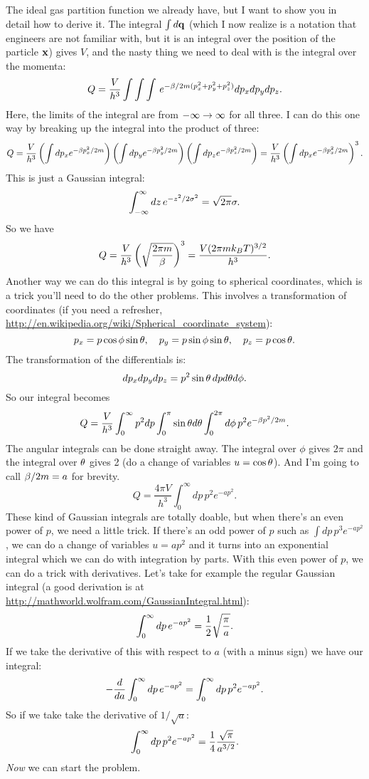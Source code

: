 \documentclass[12pt]{article}
\begin{document}
\hrulefill

 The ideal gas partition function we already have, but I want to show you in detail how to derive it. The integral $\int d\mathbf{q}$ (which I now realize is a notation that engineers are not familiar with, but it is an integral over the position of the particle $\mathbf{x}$) gives $V$, and the nasty thing we need to deal with is the integral over the momenta:
\[ Q = \frac{V}{h^3} \int \int \int \, e^{-\beta/2m (p_x^2+p_y^2+p_z^2)} dp_x dp_ydp_z.\]
Here, the limits of the integral are from $-\infty \rightarrow \infty$ for all three. I can do this one way by breaking up the integral into the product of three:
\[ Q = \frac{V}{h^3} \left( \int dp_x e^{-\beta p_x^2/2m} \right)\left( \int dp_y e^{-\beta p_y^2/2m } \right)\left( \int dp_z e^{-\beta p_z^2/2m} \right) = \frac{V}{h^3}\left( \int dp_x e^{-\beta p_x^2/2m} \right)^3.\]
This is just a Gaussian integral:
\[ \int_{-\infty}^\infty dz\, e^{-z^2/2\sigma^2} = \sqrt{2\pi}\sigma.\]
So we have
\[ Q = \frac{V}{h^3}\left( \sqrt{\frac{2\pi m}{\beta}}\right)^3 = \frac{V(2\pi m k_BT)^{3/2}}{h^3}.\]
Another way we can do this integral is by going to spherical coordinates, which is a trick you'll need to do the other problems. This involves a transformation of coordinates (if you need a refresher, \url{http://en.wikipedia.org/wiki/Spherical_coordinate_system}):
\[ p_x = p\cos\phi \sin\theta,\quad p_y = p\sin\phi \sin\theta, \quad p_z = p\cos\theta.\]
The transformation of the differentials is:
\[ dp_xdp_ydp_z = p^2\sin\theta \, dp d\theta d\phi.\]
So our integral becomes
\[ Q = \frac{V}{h^3} \int_0^\infty p^2 dp \int_0^\pi \sin\theta d\theta \int_0^{2\pi} d \phi \, p^2 e^{-\beta p^2/2m}.\]
The angular integrals can be done straight away. The integral over $\phi$ gives $2\pi$ and the integral over $\theta$ gives 2 (do a change of variables $u = \cos\theta$). And I'm going to call $\beta/2m = a$ for brevity.
\[ Q = \frac{4\pi V}{h^3} \int_0^\infty dp \, p^2 e^{-ap^2}.\]
These kind of Gaussian integrals are totally doable, but when there's an even power of $p$, we need a little trick. If there's an odd power of $p$ such as $\int dp \, p^3 e^{-ap^2}$, we can do a change of variables $u = ap^2$ and it turns into an exponential integral which we can do with integration by parts. With this even power of $p$, we can do a trick with derivatives. Let's take for example the regular Gaussian integral (a good derivation is at \url{http://mathworld.wolfram.com/GaussianIntegral.html}):
\[ \int_0^\infty dp\, e^{-ap^2} = \frac{1}{2}\sqrt{\frac{\pi}{a}}.\]
If we take the derivative of this with respect to $a$ (with a minus sign) we have our integral:
\[ -\frac{d {}}{d {a}} \int_0^\infty dp\, e^{-ap^2} = \int_0^{\infty} dp\, p^2 e^{-ap^2}.\]
So if we take take the derivative of $1/\sqrt{a}$:
\[ \int_0^\infty dp\, p^2 e^{-ap^2} = \frac{1}{4}\frac{\sqrt{\pi}}{a^{3/2}}.\]
\emph{Now} we can start the problem.
\end{document}
